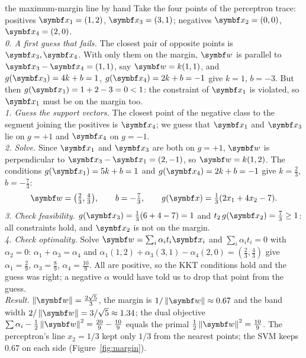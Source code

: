 \documentclass[11pt]{article}
\newcommand{\w}{\vect{w}}
\begin{document}
\begin{worked}{the maximum-margin line by hand}
Take the four points of the perceptron trace: positives $\x_1 = (1, 2)$, $\x_3 = (3, 1)$; negatives $\x_2 = (0, 0)$,
$\x_4 = (2, 0)$.\\[0.3em]
\emph{0. A first guess that fails.} The closest pair of opposite points is $\x_3, \x_4$. With only them on the margin,
$\w$ is parallel to $\x_3 - \x_4 = (1, 1)$, say $\w = k(1, 1)$, and $g(\x_3) = 4k + b = 1$, $g(\x_4) = 2k + b = -1$ give
$k = 1$, $b = -3$. But then $g(\x_1) = 1 + 2 - 3 = 0 < 1$: the constraint of $\x_1$ is violated, so $\x_1$ must be on the
margin too.\\[0.3em]
\emph{1. Guess the support vectors.} The closest point of the negative class to the segment joining the positives is
$\x_4$; we guess that $\x_1$ and $\x_3$ lie on $g = +1$ and $\x_4$ on $g = -1$.\\[0.3em]
\emph{2. Solve.} Since $\x_1$ and $\x_3$ are both on $g = +1$, $\w$ is perpendicular to $\x_3 - \x_1 = (2, -1)$, so
$\w = k(1, 2)$. The conditions $g(\x_1) = 5k + b = 1$ and $g(\x_4) = 2k + b = -1$ give $k = \frac23$, $b = -\frac73$:
\[
  \w = \big(\tfrac23, \tfrac43\big), \qquad b = -\tfrac73, \qquad g(\x) = \tfrac13(2x_1 + 4x_2 - 7) .
\]
\emph{3. Check feasibility.} $g(\x_3) = \frac13(6 + 4 - 7) = 1$ and $t_2\,g(\x_2) = \frac73 \ge 1$: all constraints hold,
and $\x_2$ is not on the margin.\\[0.3em]
\emph{4. Check optimality.} Solve $\w = \sum_i \alpha_i t_i\x_i$ and $\sum_i \alpha_i t_i = 0$ with $\alpha_2 = 0$:
$\alpha_1 + \alpha_3 = \alpha_4$ and $\alpha_1(1, 2) + \alpha_3(3, 1) - \alpha_4(2, 0) = (\frac23, \frac43)$ give
$\alpha_1 = \frac29$, $\alpha_3 = \frac89$, $\alpha_4 = \frac{10}{9}$. All are positive, so the KKT conditions hold and the
guess was right; a negative $\alpha$ would have told us to drop that point from the guess.\\[0.3em]
\emph{Result.} $\norm{\w} = \frac{2\sqrt5}{3}$, the margin is $1/\norm{\w} \approx 0.67$ and the band width $2/\norm{\w} =
3/\sqrt5 \approx 1.34$; the dual
objective $\sum\alpha_i - \frac12\norm{\w}^2 = \frac{20}{9} - \frac{10}{9}$ equals the primal $\frac12\norm{\w}^2 = \frac{10}{9}$.
The perceptron's line $x_2 = 1/3$ kept only $1/3$ from the nearest points; the SVM keeps $0.67$ on each side
(Figure~\ref{fig:margin}).
\end{worked}
\end{document}
